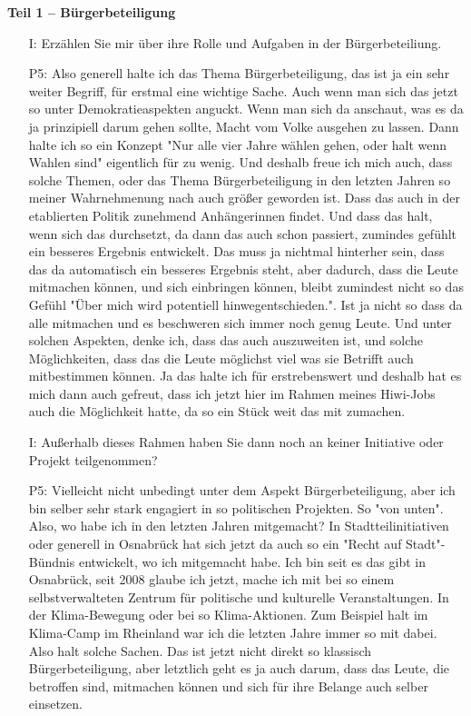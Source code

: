 \textbf{Teil 1 -- B{\"u}rgerbeteiligung}
\begin{itemize}
    \item[I:] Erz{\"a}hlen Sie mir {\"u}ber ihre Rolle und Aufgaben in der B{\"u}rgerbeteiliung.
    \item[P5:] Also generell halte ich das Thema B{\"u}rgerbeteiligung, das ist ja ein sehr weiter Begriff, f{\"u}r erstmal eine wichtige Sache. Auch wenn man sich das jetzt so unter Demokratieaspekten anguckt. Wenn man sich da anschaut, was es da ja prinzipiell darum gehen sollte, Macht vom Volke ausgehen zu lassen. Dann halte ich so ein Konzept "Nur alle vier Jahre w{\"a}hlen gehen, oder halt wenn Wahlen sind" eigentlich f{\"u}r zu wenig. Und deshalb freue ich mich auch, dass solche Themen, oder das Thema B{\"u}rgerbeteiligung in den letzten Jahren so meiner Wahrnehmenung nach auch gr{\"o}{\ss}er geworden ist. Dass das auch in der etablierten Politik zunehmend Anh{\"a}ngerinnen findet. Und dass das halt, wenn sich das durchsetzt, da dann das auch schon passiert, zumindes gef{\"u}hlt ein besseres Ergebnis entwickelt. Das muss ja nichtmal hinterher sein, dass das da automatisch ein besseres Ergebnis steht, aber dadurch, dass die Leute mitmachen k{\"o}nnen, und sich einbringen k{\"o}nnen, bleibt zumindest nicht so das Gef{\"u}hl "{\"U}ber mich wird potentiell hinwegentschieden.". Ist ja nicht so dass da alle mitmachen und es beschweren sich immer noch genug Leute. Und unter solchen Aspekten, denke ich, dass das auch auszuweiten ist, und solche M{\"o}glichkeiten, dass das die Leute m{\"o}glichst viel was sie Betrifft auch mitbestimmen k{\"o}nnen. Ja das halte ich f{\"u}r erstrebenswert und deshalb hat es mich dann auch	gefreut, dass ich jetzt hier im Rahmen meines Hiwi-Jobs auch die M{\"o}glichkeit hatte, da so ein St{\"u}ck weit das mit zumachen.
    \item[I:] Au{\ss}erhalb dieses Rahmen haben Sie dann noch an keiner Initiative oder Projekt teilgenommen?
    \item[P5:] Vielleicht nicht unbedingt unter dem Aspekt B{\"u}rgerbeteiligung, aber ich bin selber sehr stark engagiert in so politischen Projekten. So "von unten". Also, wo habe ich in den letzten Jahren mitgemacht? In Stadtteilinitiativen oder generell in Osnabr{\"u}ck hat sich jetzt da auch so ein "Recht auf Stadt"-B{\"u}ndnis entwickelt, wo ich mitgemacht habe. Ich bin seit es das gibt in Osnabr{\"u}ck, seit 2008 glaube ich jetzt, mache ich mit bei so einem selbstverwalteten Zentrum f{\"u}r politische und kulturelle Veranstaltungen. In der Klima-Bewegung oder bei so Klima-Aktionen. Zum Beispiel halt im Klima-Camp im Rheinland war ich die letzten Jahre immer so mit dabei. Also halt solche Sachen. Das ist jetzt nicht direkt so klassisch B{\"u}rgerbeteiligung, aber letztlich geht es ja auch darum, dass das Leute, die betroffen sind, mitmachen k{\"o}nnen und sich f{\"u}r ihre Belange auch selber einsetzen.

\end{itemize}
